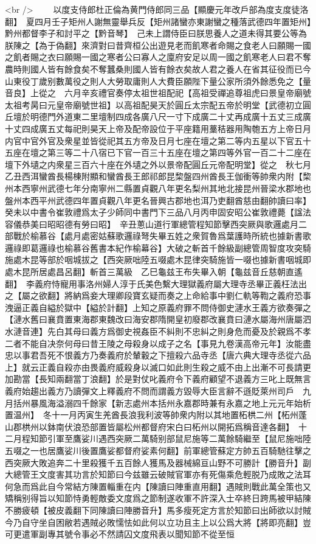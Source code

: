 <br />
　　以度支侍郎杜正倫為黄門侍郎同三品【顯慶元年改戶部為度支度徒洛翻】　夏四月壬子矩州人謝無靈舉兵反【矩州諸蠻亦東謝蠻之種落武德四年置矩州】黔州都督李子和討平之【黔音琴】　己未上謂侍臣曰朕思養人之道未得其要公等為朕陳之【為于偽翻】來濟對曰昔齊桓公出遊見老而飢寒者命賜之食老人曰願賜一國之飢者賜之衣曰願賜一國之寒者公曰寡人之廩府安足以周一國之飢寒老人曰君不奪農時則國人皆有餘食矣不奪蠶桑則國人皆有餘衣矣故人君之養人在省其征役而已今山東役丁歲别數萬役之則人大勞取庸則人大費臣願陛下量公家所須外餘悉免之【量音良】上從之　六月辛亥禮官奏停太祖世祖配祀【高祖受禪追尊祖虎曰景皇帝廟號太祖考昺曰元皇帝廟號世祖】以高祖配昊天於圓丘太宗配五帝於明堂【武德初立圓丘壇於明德門外道東二里壇制四成各廣八尺一寸下成廣二十丈再成廣十五丈三成廣十丈四成廣五丈每祀則昊天上帝及配帝設位于平座籍用藳秸器用陶匏五方上帝日月内官中官外官及衆星並皆從祀其五方帝及日月七座在壇之第二等内五星以下官五十五座在壇之第三等二十八宿已下官一百三十五座在壇之第四等外官一百二十二座在壇下外壝之内衆星三百六十座在外壝之外以景帝配圓丘元帝配明堂】從之　秋七月乙丑西洱蠻酋長楊棟附顯和蠻酋長王郎祁郎昆棃盤四州酋長王伽衝等帥衆内附【棃州本西寧州武德七年分南寧州二縣置貞觀八年更名梨州其地北接昆州晉梁水郡地也盤州本西平州武德四年置貞觀八年更名晉興古郡地也洱乃吏翻酋慈由翻帥讀曰率】　癸未以中書令崔敦禮爲太子少師同中書門下三品八月丙申固安昭公崔敦禮薨【諡法容儀恭美曰昭昭德有勞曰昭】　辛丑蔥山道行軍總管程知節擊西突厥與歌邏處月二部戰於榆慕谷【處月處密姑蘇歌邏祿弩失畢五姓之衆賀魯爲葉護時所統也據新書歌邏祿即葛邏祿也榆慕谷舊書本紀作榆幕谷】大破之斬首千餘級副總管周智度攻突騎施處木昆等部於咽城拔之【西突厥咄陸五啜處木昆律突騎施皆一啜也據新書咽城即處木昆所居處昌呂翻】斬首三萬級　乙巳龜兹王布失畢入朝【龜兹音丘慈朝直遙翻】　李義府恃寵用事洛州婦人淳于氏美色繫大理獄義府屬大理寺丞畢正義枉法出之【屬之欲翻】將納爲妾大理卿段寶玄疑而奏之上命給事中劉仁軌等鞫之義府恐事洩逼正義自縊於獄中【縊於計翻】上知之原義府罪不問侍御史漣水王義方欲奏彈之【漣水舊曰襄賁置東海郡東魏改曰海安郡隋開皇初廢郡改襄賁曰漣水屬海州唐屬泗水漣音連】先白其母曰義方爲御史視姦臣不糾則不忠糾之則身危而憂及於親爲不孝二者不能自决奈何母曰昔王陵之母殺身以成子之名【事見九卷漢高帝元年】汝能盡忠以事君吾死不恨義方乃奏義府於輦轂之下擅殺六品寺丞【唐六典大理寺丞從六品上】就云正義自殺亦由畏義府威殺身以滅口如此則生殺之威不由上出漸不可長請更加勘當【長知兩翻當丁浪翻】於是對仗叱義府令下義府顧望不退義方三叱上既無言義府始趨出義方乃讀彈文上釋義府不問而謂義方毀辱大臣言辭不遜貶萊州司戶　九月括州暴風海溢溺四千餘家【新志處州本括州永嘉郡時兼有永嘉之地上元元年始析置温州】　冬十一月丙寅生羌酋長浪我利波等帥衆内附以其地置柘栱二州【柘州蓬山郡栱州以鉢南伏浪恐部置皆屬松州都督府宋白曰柘州以開拓爲稱音達各翻】　十二月程知節引軍至鷹娑川遇西突厥二萬騎别部鼠尼施等二萬餘騎繼至【鼠尼施咄陸五啜之一也居鷹娑川後置鷹娑都督府娑素何翻】前軍總管蘇定方帥五百騎馳往擊之西突厥大敗追奔二十里殺獲千五百餘人獲馬及器械綿亘山野不可勝計【勝音升】副大總管王文度害其功言於知節曰今兹雖云破賊官軍亦有死傷乘危輕脱乃成敗之法耳何急而爲此自今常結方陳置輜重在内【陳讀曰陣重直用翻】遇賊則戰此萬全策也又矯稱别得旨以知節恃勇輕敵委文度爲之節制遂收軍不許深入士卒終日跨馬被甲結陳不勝疲頓【被皮義翻下同陳讀曰陣勝音升】馬多瘦死定方言於知節曰出師欲以討賊今乃自守坐自困敝若遇賊必敗懦怯如此何以立功且主上以公爲大將【將即亮翻】豈可更遣軍副專其號令事必不然請囚文度飛表以聞知節不從至恒